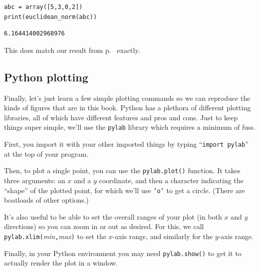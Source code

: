 \begin{Verbatim}[fontsize=\small,samepage=true,frame=single,framesep=3mm]
abc = array([5,3,0,2])
print(euclidean_norm(abc))
\end{Verbatim}
\vspace{-.2in}

\begin{Verbatim}[fontsize=\small,samepage=true,frame=leftline,framesep=5mm,framerule=1mm]
6.164414002968976
\end{Verbatim}

This does match our result from p.~\pageref{pythonNorm} exactly.

\pagebreak

\subsection*{Python plotting}


Finally, let's just learn a few simple plotting commands so we can reproduce
the kinds of figures that are in this book. Python has a plethora of different
plotting libraries, all of which have different features and pros and cons.
Just to keep things super simple, we'll use the \texttt{pylab} library which
requires a minimum of fuss.

First, you import it with your other imported things by typing ``\texttt{import
pylab}'' at the top of your program.

Then, to plot a single point, you can use the \texttt{pylab.plot()} function.
It takes three arguments: an $x$ and a $y$ coordinate, and then a character
indicating the ``shape'' of the plotted point, for which we'll use \texttt{'o'}
to get a circle. (There are boatloads of other options.)


It's also useful to be able to set the overall ranges of your plot (in both $x$
and $y$ directions) so you can zoom in or out as desired. For this, we call
\texttt{pylab.xlim(}\textsl{min}\texttt{,}\textsl{max}\texttt{)} to set the
$x$-axis range, and similarly for the $y$-axis range.

Finally, in your Python environment you may need \texttt{pylab.show()} to get
it to actually render the plot in a window.

\bigskip


